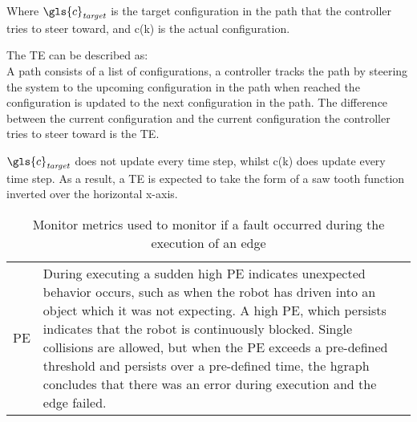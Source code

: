 Where $\gls{c}_\mathit{target}$ is the target configuration in the path that the controller tries to steer toward, and \gls{c}(\gls{k}) is the actual configuration.\bs

The \acl{TE} can be described as:\\ A path consists of a list of configurations, a controller tracks the path by steering the system to the upcoming configuration in the path when reached the configuration is updated to the next configuration in the path. The difference between the current configuration and the current configuration the controller tries to steer toward is the \ac{TE}.\bs

$\gls{c}_\mathit{target}$ does not update every time step, whilst \gls{c}(\gls{k}) does update every time step. As a result, a  \ac{TE} is expected to take the form of a saw tooth function inverted over the horizontal x-axis.\bs

\noindent
\begin{table}[H]
\centering
\begin{tabular}%
  {>{\raggedleft\arraybackslash}p{}%
   >{\raggedright\arraybackslash}p{}}
\acf{PE}&  During executing a sudden high \ac{PE} indicates unexpected behavior occurs, such as when the robot has driven into an object which it was not expecting. A high \ac{PE}, which persists indicates that the robot is continuously blocked. Single collisions are allowed, but when the \ac{PE} exceeds a pre-defined threshold and persists over a pre-defined time, the \ac{hgraph} concludes that there was an error during execution and the edge failed.\\
\end{tabular}
\caption{Monitor metrics used to monitor if a fault occurred during the execution of an edge}%
\label{table:monitoring_edge_metrics}
\end{table}

